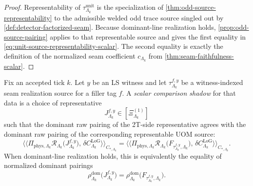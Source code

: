 \documentclass[11pt]{article}
\begin{document}
\begin{proof}
Representability of
\(
\tau^{\mathrm{unit}}_{\Lambda_k}
\)
is the specialization of \cref{thm:odd-source-representability} to the admissible welded odd trace
source singled out by \cref{def:detector-factorized-seam}.
Because dominant-line realization holds, \cref{prop:odd-source-pairing} applies to that
representable source and gives the first equality in \eqref{eq:unit-source-representability-scalar}.
The second equality is exactly the definition of the normalized seam coefficient
\(
c_{\Lambda_k}
\)
from \cref{thm:seam-faithfulness-scalar}.
\end{proof}

\begin{definition}
\label{def:witness-descendant-comparison}
Fix an accepted tick \(k\).
Let \(y\) be an LS witness and let
\(
\tau^{f,y}_{\Lambda_k}
\)
be a witness-indexed seam realization source for a filler tag \(f\).
A \emph{scalar comparison shadow} for that data is a choice of representative
\[
J^{f,y}_{\Lambda_k}\in[\Xi^{(1)}_{\Lambda_k}]
\]
such that the dominant raw pairing of the 2T-side representative agrees with the dominant raw
pairing of the corresponding representable UOM source:
\begin{equation}
\big\langle\!\big\langle
\Pi_{\mathrm{phys},\Lambda_k}\mathcal R_{\Lambda_k}\!\big(J^{f,y}_{\Lambda_k}\big),\,
\delta C^{\mathrm{LoG}}_{\Lambda_k}
\big\rangle\!\big\rangle_{C_{\ast,\Lambda_k}}
=
\big\langle\!\big\langle
\Pi_{\mathrm{phys},\Lambda_k}\mathcal R_{\Lambda_k}\!\big(F_{\tau^{f,y}_{\Lambda_k},\Lambda_k}\big),\,
\delta C^{\mathrm{LoG}}_{\Lambda_k}
\big\rangle\!\big\rangle_{C_{\ast,\Lambda_k}}.
\label{eq:witness-descendant-comparison}
\end{equation}
When dominant-line realization holds, this is equivalently the equality of normalized dominant
pairings
\begin{equation}
\rho^{\mathrm{dom}}_{\Lambda_k}\!\big(J^{f,y}_{\Lambda_k}\big)
=
\rho^{\mathrm{dom}}_{\Lambda_k}\!\big(F_{\tau^{f,y}_{\Lambda_k},\Lambda_k}\big).
\label{eq:witness-descendant-comparison-normalized}
\end{equation}
\end{definition}
\end{document}

